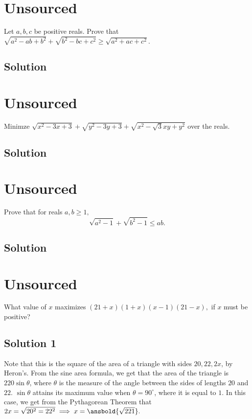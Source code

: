 \documentclass{article}
\begin{document}
\pagebreak\section{Unsourced}
Let $a,b,c$ be positive reals. Prove that $\sqrt{a^2 - ab + b^2} + \sqrt{b^2 - bc + c^2} \geq \sqrt{a^2 + ac + c^2}.$

\subsection{Solution}

\pagebreak\section{Unsourced}
Minimze $\sqrt{x^2-3x+3}+\sqrt{y^2-3y+3}+\sqrt{x^2-\sqrt{3}xy+y^2}$ over the reals.

\subsection{Solution}

\pagebreak\section{Unsourced}
Prove that for reals $a,b\geq 1,$
\[\sqrt{a^2-1}+\sqrt{b^2-1}\leq ab.\]

\subsection{Solution}

\pagebreak\section{Unsourced}
What value of $x$ maximizes $(21+x)(1+x)(x-1)(21-x),$ if $x$ must be positive?

\subsection{Solution 1}
Note that this is the square of the area of a triangle with sides $20,22,2x$, by Heron's. From the sine area formula, we get that the area of the triangle is $220\sin\theta$, where $\theta$ is the measure of the angle between the sides of lengths $20$ and $22$. $\sin\theta$ attains its maximum value when $\theta=90^\circ$, where it is equal to $1$. In this case, we get from the Pythagorean Theorem that $2x=\sqrt{20^2=22^2} \implies x=\ansbold{\sqrt{221}}.$
\end{document}
